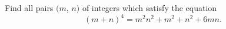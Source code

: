 Find all pairs $ (m$,  $ n)$ of integers which satisfy the equation\[ (m + n)^4 = m^2n^2 + m^2 + n^2 + 6mn.\]